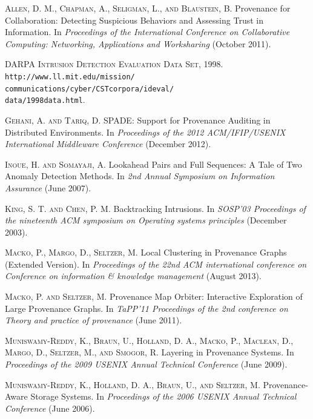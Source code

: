 \documentclass[10pt,twocolumn]{article}
\begin{document}
\begin{thebibliography}{99}

\textsc{Allen, D. M., Chapman, A., Seligman, L., and Blaustein, B.} Provenance for Collaboration: Detecting Suspicious Behaviors and Assessing Trust in Information. In {\em Proceedings of the International Conference on Collaborative Computing: Networking, Applications and Worksharing} (October 2011).

\textsc{DARPA Intrusion Detection Evaluation Data Set, 1998.} {\tt http://www.ll.mit.edu/mission/\\communications/cyber/CSTcorpora/ideval/\\data/1998data.html}.

\textsc{Gehani, A. and Tariq, D.} SPADE: Support for Provenance Auditing in Distributed Environments. In {\em Proceedings of the 2012 ACM/IFIP/USENIX International Middleware Conference} (December 2012).

\textsc{Inoue, H. and Somayaji, A.} Lookahead Pairs and Full Sequences: A Tale of Two Anomaly Detection Methods. In {\em 2nd Annual Symposium on Information Assurance} (June 2007). 

\textsc{King, S. T. and Chen, P. M.} Backtracking Intrusions. In {\em SOSP'03 Proceedings of the nineteenth ACM symposium on Operating systems principles} (December 2003).

\textsc{Macko, P., Margo, D., Seltzer, M.} Local Clustering in Provenance Graphs (Extended Version). In {\em Proceedings of the 22nd ACM international conference on Conference on information \& knowledge management} (August 2013).

\textsc{Macko, P. and Seltzer, M.} Provenance Map Orbiter: Interactive Exploration of Large Provenance Graphs. In {\em TaPP'11 Proceedings of the 2nd conference on Theory and practice of provenance} (June 2011).

\textsc{Muniswamy-Reddy, K., Braun, U., Holland, D. A., Macko, P., Maclean, D., Margo, D., Seltzer, M., and Smogor, R.} Layering in Provenance Systems. In {\em Proceedings of the 2009 USENIX Annual Technical Conference} (June 2009).

\textsc{Muniswamy-Reddy, K., Holland, D. A., Braun, U., and Seltzer, M.} Provenance-Aware Storage Systems. In {\em Proceedings of the 2006 USENIX Annual Technical Conference} (June 2006).


\end{thebibliography}
\end{document}
